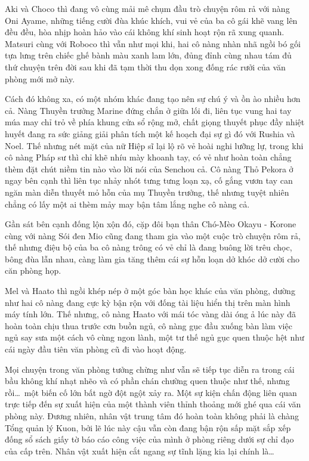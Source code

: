 \documentclass[../main.tex]{subfiles}
\begin{document}
Aki và Choco thì đang vô cùng mải mê chụm đầu trò chuyện rôm rả với nàng Oni Ayame, những tiếng cười đùa khúc khích, vui vẻ của ba cô gái khẽ vang lên đều đều, hòa nhịp hoàn hảo vào cái không khí sinh hoạt rộn rã xung quanh. Matsuri cùng với Roboco thì vẫn như mọi khi, hai cô nàng nhàn nhã ngồi bó gối tựa lưng trên chiếc ghế bành màu xanh lam lớn, đủng đỉnh cùng nhau tám đủ thứ chuyện trên đời sau khi đã tạm thời thu dọn xong đống rác rưởi của văn phòng mới mở này.

Cách đó không xa, có một nhóm khác đang tạo nên sự chú ý và ồn ào nhiều hơn cả. Nàng Thuyền trưởng Marine đứng chắn ở giữa lối đi, liên tục vung hai tay múa may chỉ trỏ về phía khung cửa sổ rộng mở, chất giọng thuyết phục đầy nhiệt huyết đang ra sức giảng giải phân tích một kế hoạch đại sự gì đó với Rushia và Noel. Thế nhưng nét mặt của nữ Hiệp sĩ lại lộ rõ vẻ hoài nghi lưỡng lự, trong khi cô nàng Pháp sư thì chỉ khẽ nhíu mày khoanh tay, có vẻ như hoàn toàn chẳng thèm đặt chút niềm tin nào vào lời nói của Senchou cả. Cô nàng Thỏ Pekora ở ngay bên cạnh thì liên tục nhảy nhót tưng tưng loạn xạ, cố gắng vươn tay can ngăn màn diễn thuyết mỏ hỗn của mụ Thuyền trưởng, thế nhưng tuyệt nhiên chẳng có lấy một ai thèm mảy may bận tâm lắng nghe cô nàng cả.

Gần sát bên cạnh đống lộn xộn đó, cặp đôi bạn thân Chó-Mèo Okayu - Korone cùng với nàng Sói đen Mio cũng đang tham gia vào một cuộc trò chuyện rôm rả, thế nhưng điệu bộ của ba cô nàng trông có vẻ chỉ là đang buông lời trêu chọc, bông đùa lẫn nhau, càng làm gia tăng thêm cái sự hỗn loạn dở khóc dở cười cho căn phòng họp.

Mel và Haato thì ngồi khép nép ở một góc bàn học khác của văn phòng, dường như hai cô nàng đang cực kỳ bận rộn với đống tài liệu hiển thị trên màn hình máy tính lớn. Thế nhưng, cô nàng Haato với mái tóc vàng dài óng ả lúc này đã hoàn toàn chịu thua trước cơn buồn ngủ, cô nàng gục đầu xuống bàn làm việc ngủ say sưa một cách vô cùng ngon lành, một tư thế ngủ gục quen thuộc hệt như cái ngày đầu tiên văn phòng cũ đi vào hoạt động.

Mọi chuyện trong văn phòng tưởng chừng như vẫn sẽ tiếp tục diễn ra trong cái bầu không khí nhạt nhẽo và có phần chán chường quen thuộc như thế, nhưng rồi\dots\ một biến cố lớn bất ngờ đột ngột xảy ra. Một sự kiện chấn động liên quan trực tiếp đến sự xuất hiện của một thành viên thỉnh thoảng mới ghé qua cái văn phòng này. Đương nhiên, nhân vật trung tâm đó hoàn toàn không phải là chàng Tổng quản lý Kuon, bởi lẽ lúc này cậu vẫn còn đang bận rộn sấp mặt sắp xếp đống sổ sách giấy tờ báo cáo công việc của mình ở phòng riêng dưới sự chỉ đạo của cấp trên. Nhân vật xuất hiện cắt ngang sự tĩnh lặng kia lại chính là\dots
\end{document}
